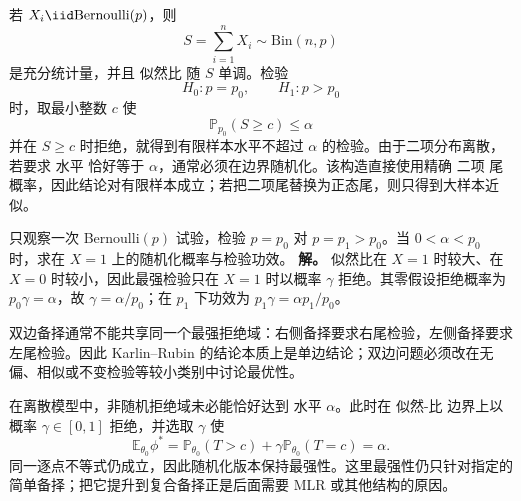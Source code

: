 \begin{exbox}[精确二项单侧检验]
若 $X_i\iid\mathrm{Bernoulli}(p)$，则
\[
 S=\sum_{i=1}^nX_i\sim\mathrm{Bin}(n,p)
\]
是充分统计量，并且 似然比 随 $S$ 单调。检验
\[
 H_0:p=p_0,
 \qquad
 H_1:p>p_0
\]
时，取最小整数 $c$ 使
\[
 \mathbb P_{p_0}(S\ge c)\le\alpha
\]
并在 $S\ge c$ 时拒绝，就得到有限样本水平不超过 $\alpha$ 的检验。由于二项分布离散，若要求 水平 恰好等于 $\alpha$，通常必须在边界随机化。该构造直接使用精确 二项 尾概率，因此结论对有限样本成立；若把二项尾替换为正态尾，则只得到大样本近似。
\end{exbox}

\begin{note}[双侧最优性与离散随机化]
\begin{workedexample}[一次试验的随机化阈值]
只观察一次 Bernoulli\((p)\) 试验，检验 \(p=p_0\) 对 \(p=p_1>p_0\)。当 \(0<\alpha<p_0\) 时，求在 \(X=1\) 上的随机化概率与检验功效。
\textbf{解。} 似然比在 \(X=1\) 时较大、在 \(X=0\) 时较小，因此最强检验只在 \(X=1\) 时以概率 \(\gamma\) 拒绝。其零假设拒绝概率为 \(p_0\gamma=\alpha\)，故 \(\gamma=\alpha/p_0\)；在 \(p_1\) 下功效为 \(p_1\gamma=\alpha p_1/p_0\)。
\end{workedexample}

双边备择通常不能共享同一个最强拒绝域：右侧备择要求右尾检验，左侧备择要求左尾检验。因此 Karlin--Rubin 的结论本质上是单边结论；双边问题必须改在无偏、相似或不变检验等较小类别中讨论最优性。

在离散模型中，非随机拒绝域未必能恰好达到 水平 $\alpha$。此时在 似然-比 边界上以概率 $\gamma\in[0,1]$ 拒绝，并选取 $\gamma$ 使
\[
\mathbb E_{\theta_0}\phi^*=\mathbb P_{\theta_0}(T>c)+\gamma\mathbb P_{\theta_0}(T=c)=\alpha.
\]
同一逐点不等式仍成立，因此随机化版本保持最强性。这里最强性仍只针对指定的简单备择；把它提升到复合备择正是后面需要 MLR 或其他结构的原因。
\end{note}

